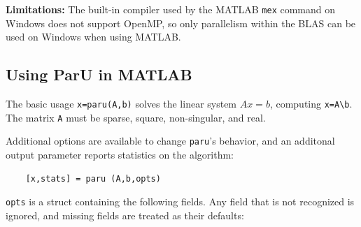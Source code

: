 \documentclass[12pt]{article}
\begin{document}
{\bf Limitations:}
The built-in compiler used by the MATLAB \verb'mex' command on Windows does not
support OpenMP, so only parallelism within the BLAS can be used on Windows
when using MATLAB.

\subsection{Using ParU in MATLAB}

The basic usage \verb'x=paru(A,b)' solves the linear system $Ax=b$, computing
\verb'x=A\b'.  The matrix \verb'A' must be sparse, square, non-singular, and
real.

Additional options are available to change \verb'paru''s behavior, and
an additonal output parameter reports statistics on the algorithm:

    \begin{verbatim}
    [x,stats] = paru (A,b,opts) \end{verbatim}

\verb'opts' is a struct containing the following fields.  Any field that is not
recognized is ignored, and missing fields are treated as their defaults:
\end{document}
